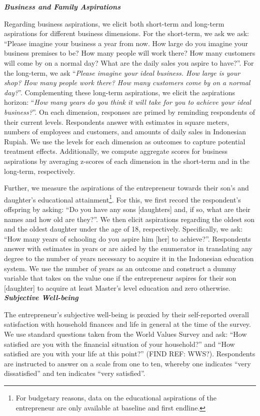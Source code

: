 \documentclass[11.5pt]{article}
\begin{document}
\textbf{\emph{Business and Family Aspirations}}

Regarding business aspirations, we elicit both short-term and long-term aspirations for different business dimensions. For the short-term, we ask we ask: ``Please imagine your business a year from now. How large do you imagine your business premises to be? How many people will work there? How many customers will come by on a normal day? What are the daily sales you aspire to have?''. For the long-term, we ask ``\emph{Please imagine your ideal business. How large is your shop? How many people work there? How many customers come by on a normal day?}''. Complementing these long-term aspirations, we elicit the aspirations horizon: ``\emph{How many years do you think it will take for you to achieve your ideal business?}''. On each dimension, responses are primed by reminding respondents of their current levels. Respondents answer with estimates in square meters, numbers of employees and customers, and amounts of daily sales in Indonesian Rupiah. We use the levels for each dimension as outcomes to capture potential treatment effects. Additionally, we compute aggregate scores for business aspirations by averaging z-scores of each dimension in the short-term and in the long-term, respectively.

Further, we measure the aspirations of the entrepreneur towards their son's and daughter's educational attainment\footnote{For budgetary reasons, data on the educational aspirations of the entrepreneur are only available at baseline and first endline.}. For this, we first record the respondent's offspring by asking: ``Do you have any sons [daughters] and, if so, what are their names and how old are they?''. We then elicit aspirations regarding the oldest son and the oldest daughter under the age of 18, respectively. Specifically, we ask: ``How many years of schooling do you aspire him [her] to achieve?''. Respondents answer with estimates in years or are aided by the enumerator in translating any degree to the number of years necessary to acquire it in the Indonesian education system. We use the number of years as an outcome and construct a dummy variable that takes on the value one if the entrepreneur aspires for their son [daughter] to acquire at least Master's level education and zero otherwise. \\

\textbf{\emph{Subjective Well-being}}

The entrepreneur's subjective well-being is proxied by their self-reported overall satisfaction with household finances and life in general at the time of the survey. We use standard questions taken from the World Values Survey and ask: ``How satisfied are you with the financial situation of your household?'' and ``How satisfied are you with your life at this point?'' (FIND REF: WWS?). Respondents are instructed to answer on a scale from one to ten, whereby one indicates ``very dissatisfied'' and ten indicates ``very satisfied''. \\
\end{document}
